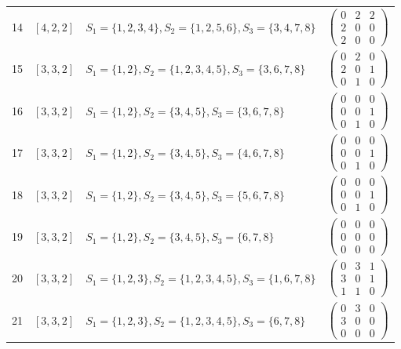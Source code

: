 \begin{longtable}{@{}r>{\raggedright\arraybackslash}p{1.5cm}>{\raggedright\arraybackslash}p{8.4cm}>{\raggedright\arraybackslash}p{4.2cm}@{}}
14 & $[4,2,2]$ & $S_{1}=\{1,2,3,4\}, S_{2}=\{1,2,5,6\}, S_{3}=\{3,4,7,8\}$ & $\left(\begin{smallmatrix}0 & 2 & 2\\2 & 0 & 0\\2 & 0 & 0\end{smallmatrix}\right)$ \\
15 & $[3,3,2]$ & $S_{1}=\{1,2\}, S_{2}=\{1,2,3,4,5\}, S_{3}=\{3,6,7,8\}$ & $\left(\begin{smallmatrix}0 & 2 & 0\\2 & 0 & 1\\0 & 1 & 0\end{smallmatrix}\right)$ \\
16 & $[3,3,2]$ & $S_{1}=\{1,2\}, S_{2}=\{3,4,5\}, S_{3}=\{3,6,7,8\}$ & $\left(\begin{smallmatrix}0 & 0 & 0\\0 & 0 & 1\\0 & 1 & 0\end{smallmatrix}\right)$ \\
17 & $[3,3,2]$ & $S_{1}=\{1,2\}, S_{2}=\{3,4,5\}, S_{3}=\{4,6,7,8\}$ & $\left(\begin{smallmatrix}0 & 0 & 0\\0 & 0 & 1\\0 & 1 & 0\end{smallmatrix}\right)$ \\
18 & $[3,3,2]$ & $S_{1}=\{1,2\}, S_{2}=\{3,4,5\}, S_{3}=\{5,6,7,8\}$ & $\left(\begin{smallmatrix}0 & 0 & 0\\0 & 0 & 1\\0 & 1 & 0\end{smallmatrix}\right)$ \\
19 & $[3,3,2]$ & $S_{1}=\{1,2\}, S_{2}=\{3,4,5\}, S_{3}=\{6,7,8\}$ & $\left(\begin{smallmatrix}0 & 0 & 0\\0 & 0 & 0\\0 & 0 & 0\end{smallmatrix}\right)$ \\
20 & $[3,3,2]$ & $S_{1}=\{1,2,3\}, S_{2}=\{1,2,3,4,5\}, S_{3}=\{1,6,7,8\}$ & $\left(\begin{smallmatrix}0 & 3 & 1\\3 & 0 & 1\\1 & 1 & 0\end{smallmatrix}\right)$ \\
21 & $[3,3,2]$ & $S_{1}=\{1,2,3\}, S_{2}=\{1,2,3,4,5\}, S_{3}=\{6,7,8\}$ & $\left(\begin{smallmatrix}0 & 3 & 0\\3 & 0 & 0\\0 & 0 & 0\end{smallmatrix}\right)$ \\

\end{longtable}
